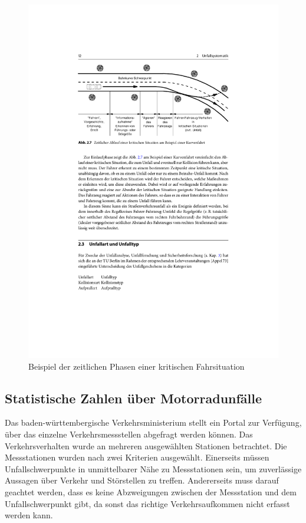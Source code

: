 \begin{figure}[htpb]
	\centering
	\includegraphics[width=\linewidth]{Bilder/Unfallforschung_2.pdf}
	\caption{Beispiel der zeitlichen Phasen einer kritischen Fahrsituation \citep{Appel2002}}
	\label{fig:BeispielZeitlichePhasenEinesUnfalls}
\end{figure}

%
%
%
%
%

\subsection{Statistische Zahlen über Motorradunfälle}
Das baden-württembergische Verkehrsministerium stellt ein Portal zur Verfügung, über das einzelne Verkehrsmessstellen abgefragt werden können. Das Verkehrsverhalten wurde an mehreren ausgewählten Stationen betrachtet. Die Messstationen wurden nach zwei Kriterien ausgewählt. Einerseits müssen Unfallschwerpunkte in unmittelbarer Nähe zu Messstationen sein, um zuverlässige Aussagen über Verkehr und Störstellen zu treffen.
Andererseits muss darauf geachtet werden, dass es keine Abzweigungen zwischen der Messstation und dem Unfallschwerpunkt gibt, da sonst das richtige Verkehrsaufkommen nicht erfasst werden kann.

